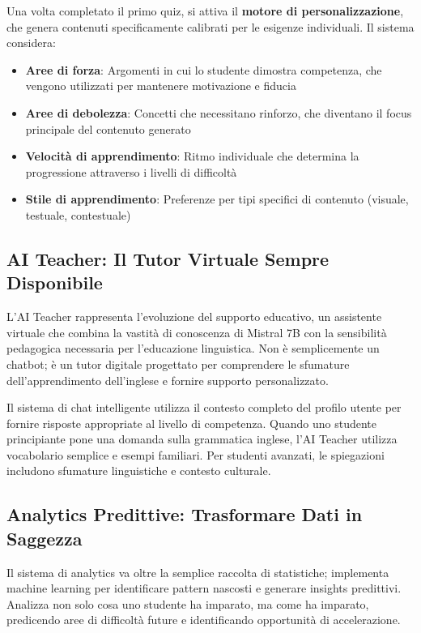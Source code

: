 \documentclass[a4paper, 14pt, oneside]{extbook}
\begin{document}
Una volta completato il primo quiz, si attiva il \textbf{motore di personalizzazione}, che genera contenuti specificamente calibrati per le esigenze individuali. Il sistema considera:

\begin{itemize}
\item \textbf{Aree di forza}: Argomenti in cui lo studente dimostra competenza, che vengono utilizzati per mantenere motivazione e fiducia
\item \textbf{Aree di debolezza}: Concetti che necessitano rinforzo, che diventano il focus principale del contenuto generato
\item \textbf{Velocità di apprendimento}: Ritmo individuale che determina la progressione attraverso i livelli di difficoltà
\item \textbf{Stile di apprendimento}: Preferenze per tipi specifici di contenuto (visuale, testuale, contestuale)
\end{itemize}

\subsection{AI Teacher: Il Tutor Virtuale Sempre Disponibile}

L'AI Teacher rappresenta l'evoluzione del supporto educativo, un assistente virtuale che combina la vastità di conoscenza di Mistral 7B con la sensibilità pedagogica necessaria per l'educazione linguistica. Non è semplicemente un chatbot; è un tutor digitale progettato per comprendere le sfumature dell'apprendimento dell'inglese e fornire supporto personalizzato.

Il sistema di chat intelligente utilizza il contesto completo del profilo utente per fornire risposte appropriate al livello di competenza. Quando uno studente principiante pone una domanda sulla grammatica inglese, l'AI Teacher utilizza vocabolario semplice e esempi familiari. Per studenti avanzati, le spiegazioni includono sfumature linguistiche e contesto culturale.

\subsection{Analytics Predittive: Trasformare Dati in Saggezza}

Il sistema di analytics va oltre la semplice raccolta di statistiche; implementa machine learning per identificare pattern nascosti e generare insights predittivi. Analizza non solo cosa uno studente ha imparato, ma come ha imparato, predicendo aree di difficoltà future e identificando opportunità di accelerazione.
\end{document}
